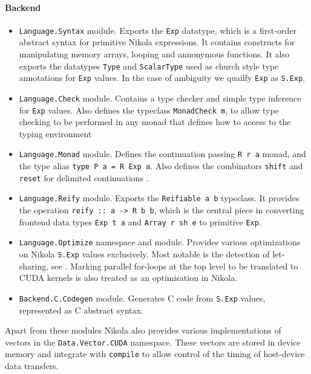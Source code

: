 \paragraph{Backend}
\begin{itemize}

  \item \texttt{Language.Syntax} module. Exports the \texttt{Exp} datatype,
    which is a first-order abstract syntax for primitive Nikola expressions. It
    contains constructs for manipulating memory arrays, looping and annonymous
    functions. It also exports the datatypes \texttt{Type} and \texttt{ScalarType}
    used as church style type annotations for \texttt{Exp} values. In the case
    of ambiguity we quailfy \texttt{Exp} as \texttt{S.Exp}.

  \item \texttt{Language.Check} module. Contains a type checker and simple type
    inference for \texttt{Exp} values. Also defines the typeclass
    \texttt{MonadCheck m}, to allow type checking to be performed in any monad
    that defines how to access to the typing environment

  \item \texttt{Language.Monad} module. Defines the continuation passing
    \texttt{R r a} monad, and the type alias \texttt{type P a = R Exp a}.
    Also defines the combinators \texttt{shift} and \texttt{reset} for
    delimited continuations \cite{waddler1994monads}.

  \item \texttt{Language.Reify} module. Exports the \texttt{Reifiable a b}
    typeclass. It provides the operation \texttt{reify :: a -> R b b},
    which is the central piece in converting frontend data types
    \texttt{Exp t a} and \texttt{Array r sh e} to primitive \texttt{Exp}.

  \item \texttt{Language.Optimize} namespace and module. Provides various
    optimizations on Nikola \texttt{S.Exp} values exclusively. Most notable is
    the detection of let-sharing, see \cite{mainland2010nikola}. Marking
    parallel for-loops at the top level to be translated to CUDA kernels is
    also treated as an optimisation in Nikola.

  \item \texttt{Backend.C.Codegen} module. Generates C code from \texttt{S.Exp}
    values, represented as C abstract syntax.

\end{itemize}

Apart from these modules Nikola also provides various implementations of
vectors in the \texttt{Data.Vector.CUDA} namespace. These vectors are
stored in device memory and integrate with \texttt{compile} to allow
control of the timing of host-device data transfers.

